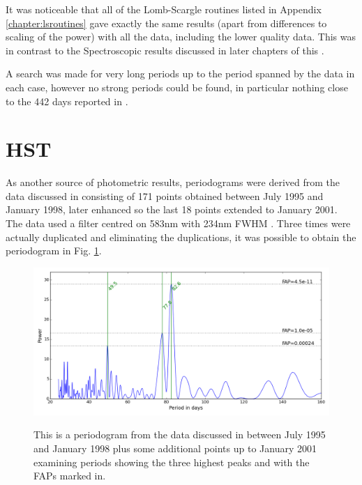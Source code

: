 It was noticeable that all of the Lomb-Scargle routines listed in Appendix \ref{chapter:lsroutines} gave exactly
the same results (apart from differences to scaling of the power) with all the {\asas} data, including the lower quality
data. This was in contrast to the Spectroscopic results discussed in later chapters of this \paperorthesis.

A search was made for very long periods up to the period spanned by the data in each case, however no strong periods
could be found, in particular nothing close to the 442 days reported in \citet{cincunegui07}.

\section{HST}
\protect\label{section:hst}

As another source of photometric results, periodograms were derived from the {\hst} data discussed in
\citealt{benedict92,benedict98} consisting of 171 points obtained between July 1995 and January 1998, later enhanced so
the last 18 points extended to January 2001. The data used a filter centred on 583nm with 234nm FWHM
\citep{benedict98}. Three times were actually duplicated and eliminating the duplications, it was possible to obtain the
periodogram in Fig. \ref{fig:hstb4min}.

\begin{figure}[!htbp]
\begin{center}
\includegraphics[scale=0.50]{Figures/hstb4min.png} \\
\end{center}
\caption{This is a periodogram from the {\hst} data discussed in \citet{benedict98} between July 1995 and January 1998 plus some additional
  points up to January 2001 examining periods showing the three highest peaks and with the FAPs marked in.}
\protect\label{fig:hstb4min}
\end{figure}

